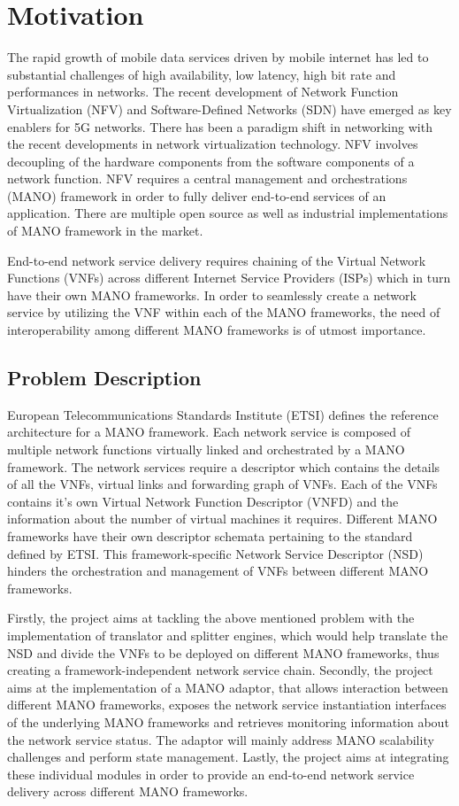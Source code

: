 \chapter{Motivation}
\label{ch:Motivation}
The rapid growth of mobile data services driven by mobile internet has led to substantial challenges of high availability, low latency, high bit rate and performances in networks. The recent development of Network Function Virtualization (NFV) and Software-Defined Networks (SDN) have emerged as key enablers for 5G networks. 
There has been a paradigm shift in networking with the recent developments in network virtualization technology. NFV involves decoupling of the hardware components from the software components of a network function. NFV requires a central management and orchestrations (MANO) framework in order to fully deliver end-to-end services of an application. There are multiple open source as well as industrial implementations of MANO framework in the market. 

End-to-end network service delivery requires chaining of the Virtual Network Functions (VNFs) across different Internet Service Providers (ISPs) which in turn have their own MANO frameworks. In order to seamlessly create a network service by utilizing the VNF within each of the MANO frameworks, the need of interoperability among different MANO frameworks is of utmost importance.


\section{Problem Description}

European Telecommunications Standards Institute (ETSI) defines the reference architecture for a MANO framework. Each network service is composed of multiple network functions virtually linked and orchestrated by a MANO framework. The network services require a descriptor which contains the details of all the VNFs, virtual links and forwarding graph of VNFs. Each of the VNFs contains it's own Virtual Network Function Descriptor (VNFD) and the information about the number of virtual machines it requires. Different MANO frameworks have their own descriptor schemata pertaining to the standard defined by ETSI. This framework-specific Network Service Descriptor (NSD) hinders the orchestration and management of VNFs between different MANO frameworks. 

Firstly, the project aims at tackling the above mentioned problem with the implementation of translator and splitter engines, which would help translate the NSD and divide the VNFs to be deployed on different MANO frameworks, thus creating a framework-independent network service chain. Secondly, the project aims at the implementation of a MANO adaptor, that allows interaction between different MANO frameworks, exposes the network service instantiation interfaces of the underlying MANO frameworks and retrieves monitoring information about the network service status. The adaptor will mainly address MANO scalability challenges and perform state management. Lastly, the project aims at integrating these individual modules in order to provide an end-to-end network service delivery across different MANO frameworks.


